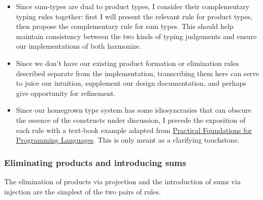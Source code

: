 \documentclass[11pt]{article}
\begin{document}
\begin{itemize}
\item Since sum-types are dual to product types, I consider their
complementary typing rules together: first I will present the relevant
rule for product types, then propose the complementary rule for sum
types. This should help maintain consistency between the two kinds of
typing judgements and ensure our implementations of both harmonize.
\item Since we don't have our existing product formation or elimination
rules described separate from the implementation, transcribing them
here can serve to juice our intuition, supplement our design
documentation, and perhaps give opportunity for refinement.
\item Since our homegrown type system has some idiosyncrasies that can
obscure the essence of the constructs under discussion, I precede the
exposition of each rule with a text-book example adapted from
\href{https://www.cs.cmu.edu/\~rwh/pfpl.html}{Practical Foundations for
Programming Languages}. This is only meant as a clarifying
touchstone.
\end{itemize}

\subsubsection{Eliminating products and introducing sums}
\label{sec:org2696367}
The elimination of products via projection and the introduction of sums
via injection are the simplest of the two pairs of rules.
\end{document}
